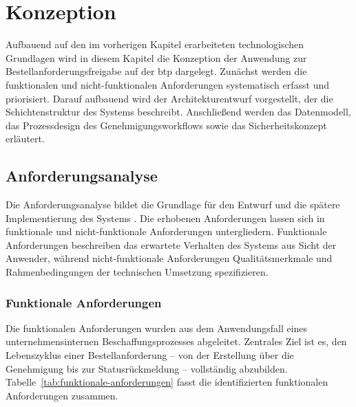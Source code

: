 \section{Konzeption}
\label{sec:konzeption}

Aufbauend auf den im vorherigen Kapitel erarbeiteten technologischen Grundlagen wird in diesem Kapitel die Konzeption der Anwendung zur Bestellanforderungsfreigabe auf der \gls{btp} dargelegt. Zunächst werden die funktionalen und nicht-funktionalen Anforderungen systematisch erfasst und priorisiert. Darauf aufbauend wird der Architekturentwurf vorgestellt, der die Schichtenstruktur des Systems beschreibt. Anschließend werden das Datenmodell, das Prozessdesign des Genehmigungsworkflows sowie das Sicherheitskonzept erläutert.

\subsection{Anforderungsanalyse}
\label{subsec:anforderungsanalyse}

Die Anforderungsanalyse bildet die Grundlage für den Entwurf und die spätere Implementierung des Systems \citep{dumas2018bpm}. Die erhobenen Anforderungen lassen sich in funktionale und nicht-funktionale Anforderungen untergliedern. Funktionale Anforderungen beschreiben das erwartete Verhalten des Systems aus Sicht der Anwender, während nicht-funktionale Anforderungen Qualitätsmerkmale und Rahmenbedingungen der technischen Umsetzung spezifizieren.

\subsubsection{Funktionale Anforderungen}
\label{subsubsec:funktionale-anforderungen}

Die funktionalen Anforderungen wurden aus dem Anwendungsfall eines unternehmensinternen Beschaffungsprozesses abgeleitet. Zentrales Ziel ist es, den Lebenszyklus einer Bestellanforderung -- von der Erstellung über die Genehmigung bis zur Statusrückmeldung -- vollständig abzubilden. Tabelle~\ref{tab:funktionale-anforderungen} fasst die identifizierten funktionalen Anforderungen zusammen.


